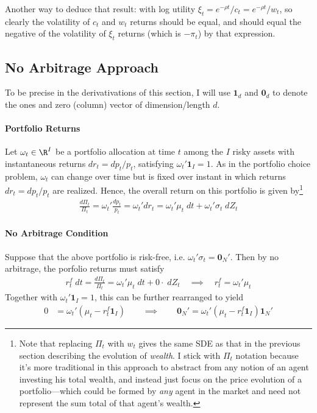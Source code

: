 \documentclass[12pt]{article}
\theoremstyle{plain}
\theoremstyle{definition}
\theoremstyle{remark}
\renewcommand{\bso}{\boldsymbol{0}}
\begin{document}
Another way to deduce that result: with log utility
$\xi_t=e^{-\rho t}/c_t=e^{-\rho t}/w_t$, so clearly the volatility of
$c_t$ and $w_t$ returns should be equal, and should equal the negative
of the volatility of $\xi_t$ returns (which is $-\pi_t$) by that
expression.






\clearpage
\subsection{No Arbitrage Approach}

To be precise in the derivativations of this section, I will use
$\mathbf{1}_d$ and $\bso_d$ to denote the ones and zero (column) vector
of dimension/length $d$.

\paragraph{Portfolio Returns}
Let $\omega_t\in\R^I$ be a portfolio allocation at time $t$ among the
$I$ risky assets with instantaneous returns $dr_t=dp_t/p_t$,
satisfying $\omega_t'\mathbf{1}_I=1$.
As in the portfolio choice problem, $\omega_t$ can change over time but
is fixed over instant in which returns $dr_t=dp_t/p_t$ are realized.
Hence, the overall return on this portfolio is given by\footnote{%
  Note that replacing $\Pi_t$ with $w_t$ gives the same SDE as that in
  the previous section describing the evolution of \emph{wealth}.
  I stick with $\Pi_t$ notation because it's more traditional in this
  approach to abstract from any notion of an agent investing his total
  wealth, and instead just focus on the price evolution of a
  portfolio---which could be formed by \emph{any} agent in the market
  and need not represent the sum total of that agent's wealth.
}
\begin{align*}
  \frac{d\Pi_t}{\Pi_t}
  = \omega_t'\frac{dp_t}{p_t}
  = \omega_t'dr_t
  = \omega_t'\mu_t\;dt + \omega_t'\sigma_t\;dZ_t
\end{align*}

\paragraph{No Arbitrage Condition}
Suppose that the above portfolio is risk-free, i.e.
$\omega_t'\sigma_t=\bso_N'$.
Then by no arbitrage, the porfolio returns must satisfy
\begin{align*}
  r_t^f\;dt
  =
  \frac{d\Pi_t}{\Pi_t}
  = \omega_t'\mu_t\;dt + 0\cdot \;dZ_t
  \quad\implies\quad
  r_t^f = \omega_t'\mu_t
\end{align*}
Together with $\omega_t'\mathbf{1}_I=1$, this can be further rearranged
to yield
\begin{align}
  0 &= \omega_t'(\mu_t-r_t^f\mathbf{1}_I)
  \qquad\implies\qquad
  \bso_N' = \omega_t'(\mu_t-r_t^f\mathbf{1}_I)\mathbf{1}_N'
  \label{noarbalmost}
\end{align}
\end{document}
